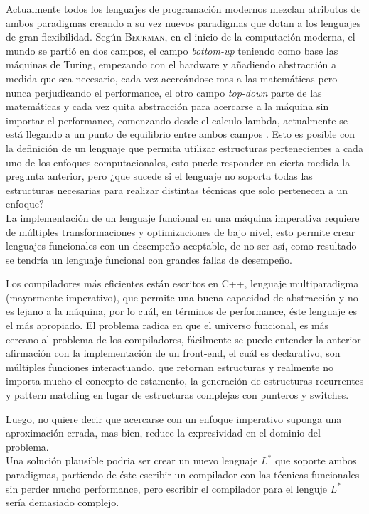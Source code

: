 Actualmente todos los lenguajes de programación modernos mezclan atributos de ambos paradigmas creando a su vez nuevos paradigmas que dotan a los lenguajes de gran flexibilidad. Según \textsc{Beckman}, en el inicio de la computación moderna, el mundo se partió en dos campos, el campo \emph{bottom-up} teniendo como base las máquinas de Turing, empezando con el hardware y añadiendo abstracción a medida que sea necesario, cada vez acercándose mas a las matemáticas pero nunca perjudicando el performance, el otro campo \emph{top-down} parte de las matemáticas y cada vez quita abstracción para acercarse a la máquina sin importar el performance, comenzando desde el calculo lambda, actualmente se está llegando a un punto de equilibrio entre ambos campos \cite{Beckman2007}  . Esto es posible con la definición de un lenguaje que permita utilizar estructuras pertenecientes a cada uno de los enfoques computacionales, esto puede responder en cierta medida la pregunta anterior, pero ¿que sucede si el lenguaje no soporta todas las estructuras necesarias para realizar distintas técnicas que solo pertenecen a un enfoque?\\

La implementación de un lenguaje funcional en una máquina imperativa requiere de múltiples transformaciones y optimizaciones de bajo nivel, esto permite crear lenguajes funcionales con un desempeño aceptable, de no ser así, como resultado se tendría un lenguaje funcional con grandes fallas de desempeño.

Los compiladores más eficientes están escritos en C++, lenguaje multiparadigma (mayormente imperativo), que permite una buena capacidad de abstracción y no es lejano a la máquina, por lo cuál, en términos de performance, éste lenguaje es el más apropiado. El problema radica en que el universo funcional, es más cercano al problema de los compiladores, fácilmente se puede entender la anterior afirmación con la implementación de un front-end, el cuál es declarativo, son múltiples funciones interactuando, que retornan estructuras y realmente no importa mucho el concepto de estamento, la generación de estructuras recurrentes y pattern matching en lugar de estructuras complejas con punteros y switches.

Luego, no quiere decir que acercarse con un enfoque imperativo suponga una aproximación errada, mas bien, reduce la expresividad en el dominio del problema.\\

Una solución plausible podria ser crear un nuevo lenguaje $L^*$ que soporte ambos paradigmas, partiendo de éste escribir un compilador con las técnicas funcionales sin perder mucho performance, pero escribir el compilador para el lenguje $L^*$ sería demasiado complejo.

